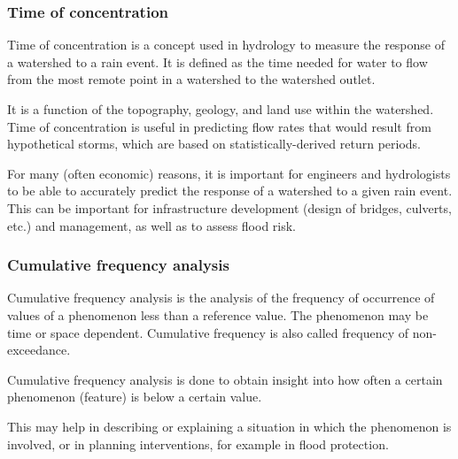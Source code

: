 \documentclass[MAIN.tex]{subfiles}
\begin{document}
	\begin{frame}
		
		\frametitle{Time of concentration}
		Time of concentration is a concept used in hydrology to measure the response of a watershed to a rain event. It is defined as the
		time needed for water to flow from the most remote point in a watershed to the watershed outlet.
		
		It is a function of the topography, geology, and land use within the watershed. Time of concentration is useful in predicting flow
		rates that would result from hypothetical storms, which are based on statistically-derived return periods.
		
		For many (often economic) reasons, it is important for engineers and hydrologists to be able to accurately predict the response of a watershed to a given rain event. This can be important for
		infrastructure development (design of bridges, culverts, etc.) and management, as well as to assess flood risk.
	\end{frame}
	\begin{frame}
		
		\frametitle{Cumulative frequency analysis}
		
		Cumulative frequency analysis is the analysis of the frequency of occurrence of values of a phenomenon less than a reference value. The phenomenon may be time or space dependent. Cumulative frequency is also called frequency of non-exceedance.
		
		Cumulative frequency analysis is done to obtain insight into how often a certain phenomenon (feature) is below a certain value.
		
		This may help in describing or explaining a situation in which the phenomenon is involved, or in planning interventions, for example
		in flood protection.
	\end{frame}
\end{document}

